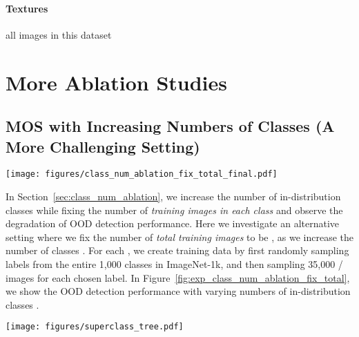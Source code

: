 \documentclass[final]{cvpr}
\begin{document}
\vspace{-0.4cm}
\paragraph{Textures} all images in this dataset
\section{More Ablation Studies}
\subsection{MOS with Increasing Numbers of Classes (A More Challenging Setting)}
\label{app:class_num_ablation_fix_total}
\begin{figure*}[t]
    \centering
    \texttt{[image: figures/class\_num\_ablation\_fix\_total\_final.pdf]}
    \caption{\small{OOD detection performance of MOS (blue) and the MSP baseline (gray). MOS exhibits more stabilized performance as the number of in-distribution classes increases. For each OOD dataset, we show AUROC (\textit{top}) and FPR95 ( \textit{bottom}). Different from Figure~\ref{fig:exp_class_num_ablation_fix_each}, we fix the number of \emph{total training images} instead of the number of \emph{training images in each category} in this experiment.}}
    \vspace{-0.1cm}
    \label{fig:exp_class_num_ablation_fix_total}
\end{figure*}

In Section~\ref{sec:class_num_ablation}, we increase the number of in-distribution classes while fixing the number of \emph{training images in each class} and observe the degradation of OOD detection performance. Here we investigate an alternative setting where we fix the number of \emph{total training images} to be , as we increase the number of classes . For each , we create training data by first randomly sampling  labels from the entire 1,000 classes in ImageNet-1k, and then sampling 35,000 /  images for each chosen label. In Figure~\ref{fig:exp_class_num_ablation_fix_total}, we show the OOD detection performance with varying numbers of in-distribution classes . 


\begin{figure*}[t]
    \centering
    \texttt{[image: figures/superclass\_tree.pdf]}
    \caption{\small{WordNet hierarchy. Super-classes of ImageNet-1k are based on the leaf nodes (in ellipses) except for \texttt{misc}. The super-class of \texttt{misc} contains 3 leaf nodes: \texttt{abstract entity}, \texttt{matter}, and \texttt{location}.}}
    \label{fig:superclass_tree}
    \vspace{-0.5cm}
\end{figure*}
\end{document}
